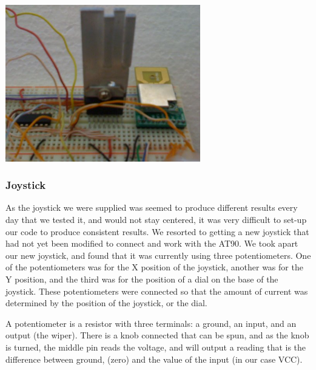 \begin{center}
  \includegraphics[width=85mm]{imageSources/designProblemsHBridgeHeatsink.png}
\end{center}
\label{HBridgeHeatsink}

\subsubsection{Joystick}
\label{sec:JoystickConst}
As the joystick we were supplied was seemed to produce different results every day that we tested it, and would not stay centered, it was very difficult to set-up our code to produce consistent results. We resorted to getting a new joystick that had not yet been modified to connect and work with the AT90. We took apart our new joystick, and found that it was currently using three potentiometers. One of the potentiometers was for the X position of the joystick, another was for the Y position, and the third was for the position of a dial on the base of the joystick. These potentiometers were connected so that the amount of current was determined by the position of the joystick, or the dial.

A potentiometer is a resistor with three terminals: a ground, an input, and an output (the wiper). There is a knob connected that can be spun, and as the knob is turned, the middle pin reads the voltage, and will output a reading that is the difference between ground, (zero) and the value of the input (in our case VCC).

